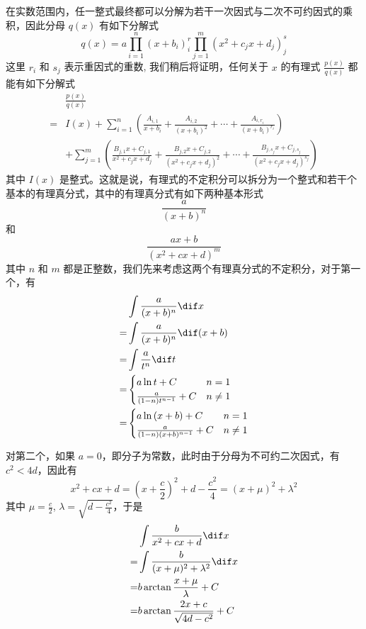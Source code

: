 在实数范围内，任一整式最终都可以分解为若干一次因式与二次不可约因式的乘积，因此分母 $q(x)$ 有如下分解式
\[ q(x) = a \prod_{i=1}^n(x+b_i)^r_i \prod_{j=1}^m(x^2+c_j x + d_j)^s_j \]
这里 $r_i$ 和 $s_j$ 表示重因式的重数, 我们稍后将证明，任何关于 $x$ 的有理式 $ \frac{p(x)}{q(x)} $ 都能有如下分解式
\begin{align*}
 & \frac{p(x)}{q(x)} \\
 = & I(x) + \sum_{i=1}^{n} \left( \frac{A_{i,1}}{x+b_i} + \frac{A_{i,2}}{(x+b_i)^2} + \cdots + \frac{A_{i,r_i}}{(x+b_i)^{r_i}}  \right) \\
 & + \sum_{j=1}^m \left( \frac{B_{j,1}x+C_{j,1}}{x^2+c_j x + d_j} + \frac{B_{j,2}x+C_{j,2}}{(x^2+c_j x + d_j)^2} + \cdots + \frac{B_{j,s_j}x+C_{j,s_j}}{(x^2+c_j x + d_j)^{s_j}} \right)
\end{align*}
其中 $I(x)$ 是整式。这就是说，有理式的不定积分可以拆分为一个整式和若干个基本的有理真分式，其中的有理真分式有如下两种基本形式
\[ \frac{a}{(x+b)^n} \]
和
\[ \frac{ax+b}{(x^2+cx+d)^m}  \]
其中 $n$ 和 $m$ 都是正整数，我们先来考虑这两个有理真分式的不定积分，对于第一个，有
\begin{align*}
 & \int \frac{a}{(x+b)^n} \dif x \\
 = & \int \frac{a}{(x+b)^n}  \dif (x+b) \\
 = &\int \frac{a}{t^n} \dif t \\
 = & 
 \begin{cases}
    a\ln{t} + C & n=1 \\
    \frac{a}{(1-n)t^{n-1}} + C & n \neq 1
 \end{cases} \\
 = &
  \begin{cases}
    a\ln{(x+b)} + C & n=1 \\
    \frac{a}{(1-n)(x+b)^{n-1}} + C & n \neq 1
 \end{cases} \\
\end{align*}

对第二个，如果 $a=0$，即分子为常数，此时由于分母为不可约二次因式，有$c^2<4d$，因此有
\[ x^2+cx+d=\left(x+\frac{c}{2}\right)^2+d-\frac{c^2}{4} = (x+\mu)^2+\lambda^2 \]
其中 $\mu = \frac{c}{2}$, $\lambda = \sqrt{d-\frac{c^2}{4}}$，于是
\begin{align*}
 &  \int \frac{b}{x^2+cx+d} \dif x \\
  = & \int \frac{b}{(x+\mu)^2+\lambda^2} \dif x \\
  = & b \arctan{\frac{x+\mu}{\lambda}} + C \\
  = & b \arctan{\frac{2x+c}{\sqrt{4d-c^2}}} + C
\end{align*}

